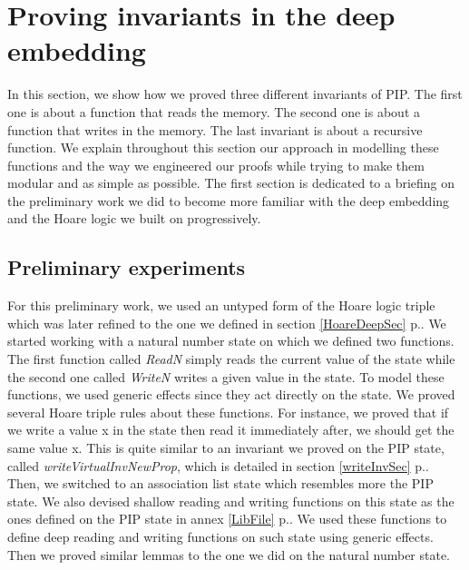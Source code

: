 \chapter{Proving invariants in the deep embedding} \label{Work}
In this section, we show how we proved three different invariants of PIP. The first one is about a function that reads the memory. The second one is about a function that writes in the memory. The last invariant is about a recursive function. We explain throughout this section our approach in modelling these functions and the way we engineered our proofs while trying to make them modular and as simple as possible. The first section is dedicated to a briefing on the preliminary work we did to become more familiar with the deep embedding and the Hoare logic we built on progressively.  

\section{Preliminary experiments}
For this preliminary work, we used an untyped form of the Hoare logic triple which was later refined to the one we defined in section \ref{HoareDeepSec} p.\pageref{HoareDeepSec}. We started working with a natural number state on which we defined two functions. The first function called \textit{ReadN} simply reads the current value of the state while the second one called \textit{WriteN} writes a given value in the state. To model these functions, we used generic effects since they act directly on the state. We proved several Hoare triple rules about these functions. For instance, we proved that if we write a value x in the state then read it immediately after, we should get the same value x. This is quite similar to an invariant we proved on the PIP state, called  \textit{writeVirtualInvNewProp}, which is  detailed in section \ref{writeInvSec} p.\pageref{writeInvSec}.\\

Then, we switched to an association list state which resembles more the PIP state. We also devised shallow reading and writing functions on this state as the ones defined on the PIP state in annex \ref{LibFile} p.\pageref{LibFile}. We used these functions to define deep reading and writing functions on such state using generic effects. Then we proved similar lemmas to the one we did on the natural number state. 

\pagebreak
 
